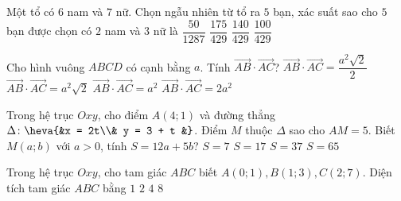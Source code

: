 \begin{ex}%
	Một tổ có $6$ nam và $7$ nữ. Chọn ngẫu nhiên từ tổ ra $5$ bạn, xác suất sao cho $5$ bạn được chọn có $2$ nam và $3$ nữ là
	\choice
	{$\dfrac{50}{1287}$}
	{\True $\dfrac{175}{429}$}
	{$\dfrac{140}{429}$}
	{$\dfrac{100}{429}$}
\end{ex}
\begin{ex}%
	Cho hình vuông $ABCD$ có cạnh bằng $a$. Tính $\vec{AB}\cdot \vec{AC}$?
	\choice
	{$\vec{AB}\cdot \vec{AC} = \dfrac{a^2 \sqrt{2}}{2}$}
	{$\vec{AB}\cdot \vec{AC} = a^2 \sqrt{2}$}
	{\True $\vec{AB}\cdot \vec{AC} = a^2$}
	{$\vec{AB}\cdot \vec{AC} = 2a^2$}	
\end{ex}

\begin{ex}%
	Trong hệ trục $Oxy$, cho điểm $A(4;1)$ và đường thẳng $\Delta \colon \heva{&x = 2t\\& y = 3 + t &}$. Điểm $M$ thuộc $\Delta$ sao cho $AM = 5$. Biết $M(a;b)$ với $a>0$, tính $S = 12a + 5b$?
	\choice
	{$S=7$}
	{$S=17$}
	{\True $S=37$}
	{$S=65$}
\end{ex}

\begin{ex}%
	 Trong hệ trục $Oxy$, cho tam giác $ABC$ biết $A(0;1), B(1;3), C(2;7)$. Diện tích tam giác $ABC$ bằng
	 \choice
	 {\True $1$}
	 {$2$}
	 {$4$}
	 {$8$}
\end{ex}



